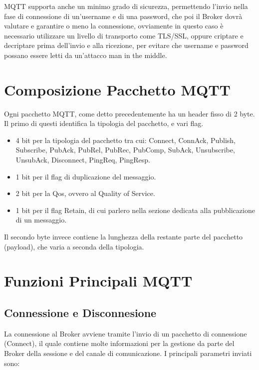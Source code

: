 \documentclass{article}
\begin{document}
MQTT supporta anche un minimo grado di sicurezza, permettendo l'invio nella fase di connessione di un'username e di una password, che poi il Broker dovrà valutare e garantire o meno la connessione, ovviamente in questo caso è necessario utilizzare un livello di transporto come TLS/SSL, oppure criptare e decriptare prima dell'invio e alla ricezione, per evitare che username e password possano essere letti da un'attacco man in the middle.


\section{Composizione Pacchetto MQTT}
Ogni pacchetto MQTT, come detto precedentemente ha un header fisso di 2 byte. Il primo di questi identifica la tipologia del pacchetto, e vari flag.
\begin{itemize}
	\item 4 bit per la tipologia del pacchetto tra cui: Connect, ConnAck, Publish, Subscribe, PubAck, PubRel, PubRec, PubComp, SubAck, Unsubscribe, UnsubAck, Disconnect, PingReq, PingResp.
	\item 1 bit per il flag di duplicazione del messaggio.
	\item 2 bit per la Qos, ovvero al Quality of Service.
	\item 1 bit per il flag Retain, di cui parlero nella sezione dedicata alla pubblicazione di un messaggio.

\end{itemize}Il secondo byte invece contiene la lunghezza della restante parte del pacchetto (payload), che varia a seconda della tipologia.

\section{Funzioni Principali MQTT}

\subsection{Connessione e Disconnesione}
La connessione al Broker avviene tramite l'invio di un pacchetto di connessione (Connect), il quale contiene molte informazioni per la gestione da parte del Broker della sessione e del canale di comunicazione. I principali parametri inviati sono:
\end{document}
